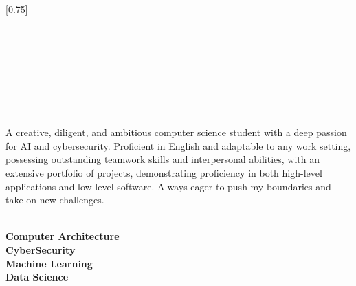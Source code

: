 \documentclass[lighthipster]{simplehipstercv}
\begin{document}
\setlength{\columnsep}{1cm}
[0.75]
\begin{paracol}{2}
 
\paracolbackgroundoptions
 
 
 
 
\footnotesize
{\setasidefontcolour
\flushright
\begin{center}
\end{center}
\begin{flushleft}
 
 \\[0.5em]
\\[0.5em]
\\[0.5em]
\\[0.5em]
\\[0.5em]
 
\bigskip
 
\\[0.5em]
 
{\footnotesize

A creative, diligent, and ambitious computer science student with a deep passion for AI and cybersecurity. Proficient in English and adaptable to any work setting, possessing outstanding teamwork skills and interpersonal abilities, with an extensive portfolio of projects, demonstrating proficiency in both high-level applications and low-level software. Always eager to push my boundaries and take on new challenges.}
\bigskip
 
 
 
 
 
 
 
 
\bigskip
 
 
\\[0.5em]
 
\textbf{Computer Architecture}\\
\textbf{CyberSecurity} \\
\textbf{Machine Learning} \\
\textbf{Data Science}
 

\end{flushleft}}
\end{paracol}
\end{document}
